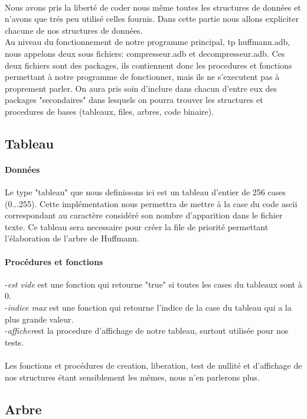 \documentclass[11pt]{article}
\begin{document}
\paragraph{}Nous avons pris la liberté de coder nous même toutes les structures de données et n'avons que trés peu utilisé celles fournis. Dans cette partie nous allons expliciter chacune de nos structures de données.\\Au niveau du fonctionnement de notre programme principal, tp huffmann.adb, nous appelons deux sous fichiers: compresseur.adb et decompresseur.adb. Ces deux fichiers sont des packages, ils contiennent donc les procedures et fonctions permettant à notre programme de fonctionner, mais ils ne s'executent pas à proprement parler. On aura pris soin d'inclure dans chacun d'entre eux des packages "secondaires" dans lesquels on pourra trouver les structures et procedures de bases (tableaux, files, arbres, code binaire).
\subsection{Tableau}
\paragraph{Données}Le type "tableau" que nous definissons ici est un tableau d'entier de 256 cases (0...255). Cette implémentation nous permettra de mettre à la case du code ascii correspondant au caractère considéré son nombre d'apparition dans le fichier texte. Ce tableau sera necessaire pour créer la file de priorité permettant l'élaboration de l'arbre de Huffmann.
\paragraph{Procédures et fonctions}-\emph{est vide} est une fonction qui retourne "true" si toutes les cases du tableaux sont à 0.\\-\emph{indice max} est une fonction qui retourne l'indice de la case du tableau qui a la plus grande valeur.\\-\emph{afficher}est la procedure d'affichage de notre tableau, surtout utilisée pour nos tests.\\ \\Les fonctions et procédures de creation, liberation, test de nullité et d'affichage de nos structures étant sensiblement les mêmes, nous n'en parlerons plus.

\subsection{Arbre}
\end{document}
